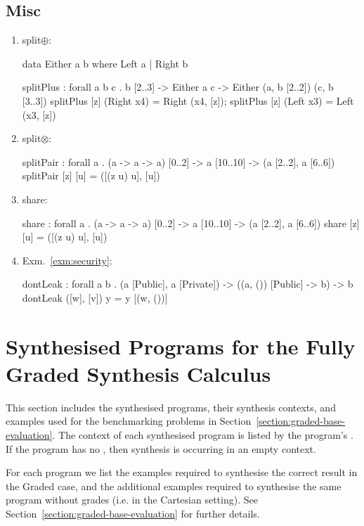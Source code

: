 \subsection{Misc}
\begin{enumerate}
\item split$\oplus$:
\begin{granule}
data Either a b where Left a | Right b

splitPlus : forall a b c 
          . b [2..3] 
          -> Either a c 
          -> Either (a, b [2..2]) (c, b [3..3])
splitPlus [z] (Right x4) = Right (x4, [z]);
splitPlus [z] (Left x3) = Left (x3, [z])
\end{granule}
\item split$\otimes$:
\begin{granule}
splitPair : forall a  
          . (a -> a -> a) [0..2] 
          -> a [10..10] 
          -> (a [2..2], a [6..6])
splitPair [z] [u] = ([(z u) u], [u])
\end{granule}
\item share:
\begin{granule}
share : forall a 
      . (a -> a -> a) [0..2] 
      -> a [10..10] 
      -> (a [2..2], a [6..6])
share [z] [u] = ([(z u) u], [u])
\end{granule}
\item Exm.~\ref{exm:security}:
\begin{granule}
dontLeak : forall a b 
         . (a [Public], a [Private]) 
         -> ((a, ()) [Public] -> b)
         -> b
dontLeak ([w], [v]) y = y [(w, ())]
\end{granule}
\end{enumerate}

\section{Synthesised Programs for the Fully Graded Synthesis Calculus}
\label{sec:graded-benchmarks}
This section includes the synthesised programs, their synthesis contexts, and
examples used for the benchmarking problems in
Section~\ref{section:graded-base-evaluation}. The context of each synthesised
program is listed by the program's . If the program has no
, then synthesis is occurring in an empty context.

For each program we list the examples required to synthesise the correct result
in the Graded case, and the additional examples required to synthesise the same
program without grades (i.e. in the Cartesian setting). See 
Section~\ref{section:graded-base-evaluation} for further details.

